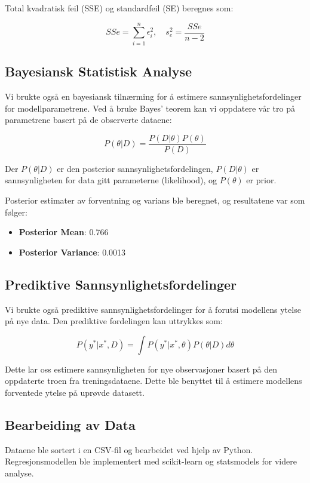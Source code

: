 \documentclass{article}
\begin{document}
Total kvadratisk feil (SSE) og standardfeil (SE) beregnes som:

\begin{equation}
    SSe = \sum_{i=1}^{n} \epsilon_i^2, \quad s^2_e = \frac{SSe}{n - 2}
\end{equation}

\subsection{Bayesiansk Statistisk Analyse}
Vi brukte også en bayesiansk tilnærming for å estimere sannsynlighetsfordelinger for modellparametrene. Ved å bruke Bayes' teorem kan vi oppdatere vår tro på parametrene basert på de observerte dataene:

\begin{equation}
    P(\theta|D) = \frac{P(D|\theta)P(\theta)}{P(D)}
\end{equation}

Der $P(\theta|D)$ er den posterior sannsynlighetsfordelingen, $P(D|\theta)$ er sannsynligheten for data gitt parameterne (likelihood), og $P(\theta)$ er prior.

Posterior estimater av forventning og varians ble beregnet, og resultatene var som følger:

\begin{itemize}
    \item \textbf{Posterior Mean}: 0.766
    \item \textbf{Posterior Variance}: 0.0013
\end{itemize}

\subsection{Prediktive Sannsynlighetsfordelinger}
Vi brukte også prediktive sannsynlighetsfordelinger for å forutsi modellens ytelse på nye data. Den prediktive fordelingen kan uttrykkes som:

\begin{equation}
    P(y^*|x^*, D) = \int P(y^*|x^*, \theta) P(\theta|D) d\theta
\end{equation}

Dette lar oss estimere sannsynligheten for nye observasjoner basert på den oppdaterte troen fra treningsdataene. Dette ble benyttet til å estimere modellens forventede ytelse på uprøvde datasett.

\subsection{Bearbeiding av Data}
Dataene ble sortert i en CSV-fil og bearbeidet ved hjelp av Python. Regresjonsmodellen ble implementert med scikit-learn og statsmodels for videre analyse.
\end{document}
